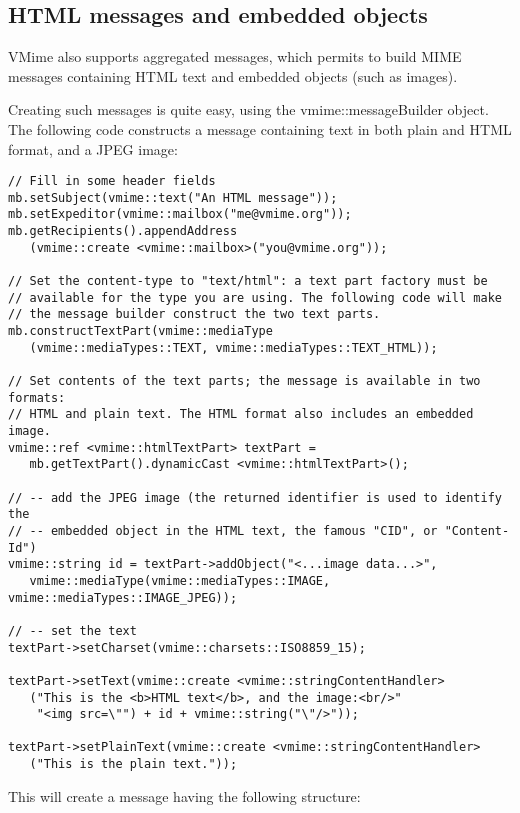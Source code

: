 \subsection{HTML messages and embedded objects} %

VMime also supports aggregated messages, which permits to build MIME messages
containing HTML text and embedded objects (such as images).

Creating such messages is quite easy, using the {\vcode vmime::messageBuilder}
object. The following code constructs a message containing text in both plain
and HTML format, and a JPEG image:

\begin{lstlisting}[caption={Building an HTML message with an embedded image
using the {\vcode vmime::messageBuilder}}]
// Fill in some header fields
mb.setSubject(vmime::text("An HTML message"));
mb.setExpeditor(vmime::mailbox("me@vmime.org"));
mb.getRecipients().appendAddress
   (vmime::create <vmime::mailbox>("you@vmime.org"));

// Set the content-type to "text/html": a text part factory must be
// available for the type you are using. The following code will make
// the message builder construct the two text parts.
mb.constructTextPart(vmime::mediaType
   (vmime::mediaTypes::TEXT, vmime::mediaTypes::TEXT_HTML));

// Set contents of the text parts; the message is available in two formats:
// HTML and plain text. The HTML format also includes an embedded image.
vmime::ref <vmime::htmlTextPart> textPart =
   mb.getTextPart().dynamicCast <vmime::htmlTextPart>();

// -- add the JPEG image (the returned identifier is used to identify the
// -- embedded object in the HTML text, the famous "CID", or "Content-Id")
vmime::string id = textPart->addObject("<...image data...>",
   vmime::mediaType(vmime::mediaTypes::IMAGE, vmime::mediaTypes::IMAGE_JPEG));

// -- set the text
textPart->setCharset(vmime::charsets::ISO8859_15);

textPart->setText(vmime::create <vmime::stringContentHandler>
   ("This is the <b>HTML text</b>, and the image:<br/>"
    "<img src=\"") + id + vmime::string("\"/>"));

textPart->setPlainText(vmime::create <vmime::stringContentHandler>
   ("This is the plain text."));
\end{lstlisting}

This will create a message having the following structure:

